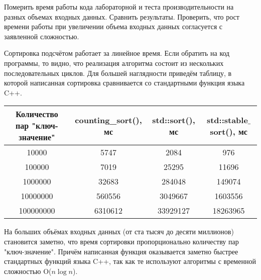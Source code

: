 \documentclass[12pt]{article}
\begin{document}
Померить время работы кода лабораторной и теста производительности
на разных объемах входных данных. Сравнить результаты. Проверить,
что рост времени работы при увеличении объема входных данных
согласуется с заявленной сложностью.

Сортировка подсчётом работает за линейное время. Если обратить на код программы, то видно, что реализация алгоритма состоит из нескольких последовательных циклов. Для большей наглядности приведём таблицу, в которой написанная сортировка сравнивается со стандартными функция языка C++.

\begin{center}
\begin{tabular}{ |c|c|c|c| }
    \hline
    Количество пар "ключ-значение" & counting\_sort(), мс & std::sort(), мс & std::stable$\_$sort(), мс \\
    \hline
    10000 & 5747 & 2084 & 976 \\
    100000 & 7019 & 25295 & 11696 \\
    1000000 & 32683 & 284048 & 149074 \\
    10000000 & 560556 & 3049667 & 1603556 \\
    100000000 & 6310612 & 33929127 & 18263965 \\
    \hline
    \end{tabular}
\end{center}

На больших объёмах входных данных (от ста тысяч до десяти миллионов) становится заметно, что время сортировки пропорционально количеству пар "ключ-значение". Причём написанная функция оказывается заметно быстрее стандартных функций языка C++, так как те используют алгоритмы с временной сложностью O($n \log{n}$).
\end{document}
